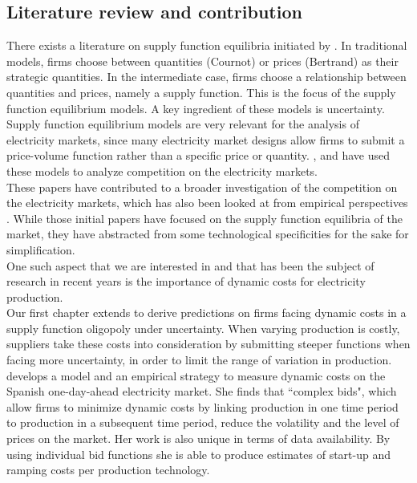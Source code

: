 \subsection{Literature review and contribution}
\label{litrev}

There exists a literature on supply function equilibria initiated by \cite{KM}. 
In traditional models, firms choose between quantities (Cournot) or prices (Bertrand) as their strategic quantities. In the intermediate case, firms choose a relationship between quantities and prices, namely a supply function. This is the focus of the supply function equilibrium models.
A key ingredient of these models is uncertainty.\\

Supply function equilibrium models are very relevant for the analysis of electricity markets, since many electricity market designs allow firms to submit a price-volume function rather than a specific price or quantity. \cite{Newgreen}, \cite{newbery1998competition} and \cite{bolle1992supply} have used these models to analyze competition on the electricity markets. \\

These papers have contributed to a broader investigation of the competition on the electricity markets, which has also been looked at from empirical perspectives \cite{wolfram1998strategic, borensteinetal2002marketineffs}.
While those initial papers have focused on the supply function equilibria of the market, they have abstracted from some technological specificities for the sake for simplification. \\

One such aspect that we are interested in and that has been the subject of research in recent years is the importance of dynamic costs for electricity production. \\
Our first chapter extends \cite{KM} to derive predictions on firms facing dynamic costs in a supply function oligopoly under uncertainty. 
When varying production is costly, suppliers take these costs into consideration by submitting steeper functions when facing more uncertainty, in order to limit the range of variation in production.
\cite{reguant2011welfare} develops a model and an empirical strategy to measure dynamic costs on the Spanish one-day-ahead electricity market. She finds that ``complex bids", which allow firms to minimize dynamic costs by linking production in one time period to production in a subsequent time period, reduce the volatility and the level of prices on the market.  Her work is also unique in terms of data availability. By using individual bid functions she is able to produce estimates of start-up and ramping costs per production technology. \\


